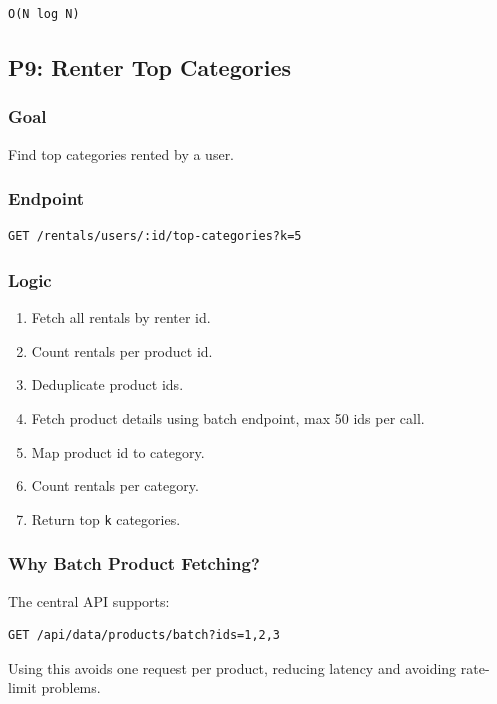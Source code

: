 \documentclass[11pt,a4paper]{article}
\begin{document}
\begin{lstlisting}
O(N log N)
\end{lstlisting}

\subsection{P9: Renter Top Categories}

\subsubsection*{Goal}
Find top categories rented by a user.

\subsubsection*{Endpoint}

\begin{lstlisting}
GET /rentals/users/:id/top-categories?k=5
\end{lstlisting}

\subsubsection*{Logic}

\begin{enumerate}
  \item Fetch all rentals by renter id.
  \item Count rentals per product id.
  \item Deduplicate product ids.
  \item Fetch product details using batch endpoint, max 50 ids per call.
  \item Map product id to category.
  \item Count rentals per category.
  \item Return top \texttt{k} categories.
\end{enumerate}

\subsubsection*{Why Batch Product Fetching?}

The central API supports:

\begin{lstlisting}
GET /api/data/products/batch?ids=1,2,3
\end{lstlisting}

Using this avoids one request per product, reducing latency and avoiding rate-limit problems.
\end{document}

